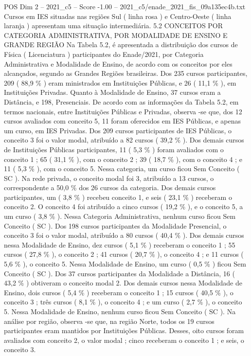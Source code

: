 \begin{textsample}{POS Dim 2 – 2021\_c5 – Score -1.00 – 2021\_c5/enade\_2021\_fis\_09a135ec4b.txt}
Cursos em IES situadas nas regiões Sul ( linha rosa ) e Centro-Oeste ( linha laranja ) apresentam uma situação intermediária. 5.2 CONCEITOS POR CATEGORIA ADMINISTRATIVA, POR MODALIDADE DE ENSINO E GRANDE REGIÃO Na Tabela 5.2, é apresentada a distribuição dos cursos de Física ( Licenciatura ) participantes do Enade/2021, por Categoria Administrativa e Modalidade de Ensino, de acordo com os conceitos por eles alcançados, segundo as Grandes Regiões brasileiras.
Dos 235 cursos participantes, 209 ( 88,9 \% ) eram ministrados em Instituições Públicas, e 26 ( 11,1 \% ), em Instituições Privadas.
Quanto à Modalidade de Ensino, 37 cursos eram a Distância, e 198, Presenciais.
De acordo com as informações da Tabela 5.2, em termos nacionais, entre Instituições Públicas e Privadas, observa -se que, dos 12 cursos avaliados com conceito 5, 11 foram oferecidos em IES Públicas, e apenas um curso, em IES Privadas.
Dos 209 cursos participantes de IES Públicas, o conceito 3 foi o valor modal, atribuído a 82 cursos ( 39,2 \% ).
Dos demais cursos de Instituições Públicas participantes, 11 ( 5,3 \% ) foram avaliados com o conceito 1 ; 65 ( 31,1 \% ), com o conceito 2 ; 39 ( 18,7 \% ), com o conceito 4 ; e 11 ( 5,3 \% ), com o conceito 5.
Nessa categoria, um curso ficou Sem Conceito ( SC ).
Na rede privada, o conceito modal foi 3, atribuído a 13 cursos, o correspondente a 50,0 \% dos 26 cursos da categoria.
Dos demais cursos participantes, um ( 3,8 \% ) recebeu conceito 1, e seis ( 23,1 \% ) receberam o conceito 2.
O conceito 4 foi atribuído a cinco cursos ( 19,2 \% ), e o conceito 5, a um curso ( 3,8 \% ).
Nessa Categoria Administrativa, nenhum curso ficou Sem Conceito ( SC ).
Dos 198 cursos participantes da Modalidade Presencial, o conceito 3 foi o valor modal, atribuído a 80 cursos ( 40,4 \% ).
Dos demais cursos nessa Modalidade de Ensino, dez cursos ( 5,1 \% ) receberam o conceito 1 ; 55 cursos ( 27,8 \% ), o conceito 2 ; 41 cursos ( 20,7 \% ), o conceito 4 ; e 11 cursos ( 5,6 \% ), o conceito 5.
Nessa Modalidade de Ensino, um curso ( 0,5 \% ) ficou Sem Conceito ( SC ).
Dos 37 cursos participantes da Modalidade a Distância, 16 ( 43,2 \% ) obtiveram o conceito modal 2.
Dos demais cursos nessa Modalidade de Ensino, dois cursos ( 5,4 \% ) receberam o conceito 1 ; 15 cursos ( 40,5 \% ), o conceito 3 ; três cursos ( 8,1 \% ), o conceito 4 ; e um curso ( 2,7 \% ), o conceito 5.
Nessa Modalidade de Ensino, nenhum curso ficou Sem Conceito ( SC ).
Na análise por região, observa -se que, na região Norte, todos os 19 cursos participantes eram mantidos por Instituições Públicas.
Desses, oito cursos foram avaliados com conceito 2, o valor modal ; cinco receberam o conceito 1 ; e seis, o conceito 3.

\end{textsample}
